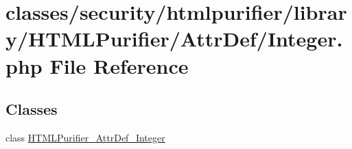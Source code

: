 \hypertarget{Integer_8php}{\section{classes/security/htmlpurifier/library/\+H\+T\+M\+L\+Purifier/\+Attr\+Def/\+Integer.php File Reference}
\label{Integer_8php}
}
\subsection*{Classes}
\begin{DoxyCompactItemize}
\item 
class \hyperlink{classHTMLPurifier__AttrDef__Integer}{H\+T\+M\+L\+Purifier\+\_\+\+Attr\+Def\+\_\+\+Integer}
\end{DoxyCompactItemize}
